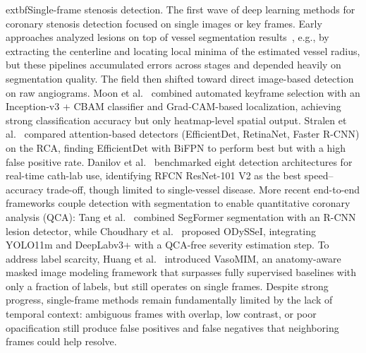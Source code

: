 \documentclass{article}
\begin{document}
	extbf{Single-frame stenosis detection.} The first wave of deep learning methods for coronary stenosis detection focused on single images or key frames. Early approaches analyzed lesions on top of vessel segmentation results~\cite{ZHAO2021104667, menezes2023, molenar}, e.g., by extracting the centerline and locating local minima of the estimated vessel radius, but these pipelines accumulated errors across stages and depended heavily on segmentation quality. The field then shifted toward direct image-based detection on raw angiograms. Moon et al.~\cite{MOON2021105819} combined automated keyframe selection with an Inception-v3 + CBAM classifier and Grad-CAM-based localization, achieving strong classification accuracy but only heatmap-level spatial output. Stralen et al.~\cite{attentionstenosis} compared attention-based detectors (EfficientDet, RetinaNet, Faster R-CNN) on the RCA, finding EfficientDet with BiFPN to perform best but with a high false positive rate. Danilov et al.~\cite{Danilov2021} benchmarked eight detection architectures for real-time cath-lab use, identifying RFCN ResNet-101 V2 as the best speed--accuracy trade-off, though limited to single-vessel disease. More recent end-to-end frameworks couple detection with segmentation to enable quantitative coronary analysis (QCA): Tang et al.~\cite{aipoweredrealtime} combined SegFormer segmentation with an R-CNN lesion detector, while Choudhary et al.~\cite{choudhary2026odysseiopensourceendtoendframework} proposed ODySSeI, integrating YOLO11m and DeepLabv3+ with a QCA-free severity estimation step. To address label scarcity, Huang et al.~\cite{huang2026vasomim} introduced VasoMIM, an anatomy-aware masked image modeling framework that surpasses fully supervised baselines with only a fraction of labels, but still operates on single frames. Despite strong progress, single-frame methods remain fundamentally limited by the lack of temporal context: ambiguous frames with overlap, low contrast, or poor opacification still produce false positives and false negatives that neighboring frames could help resolve.
\end{document}
